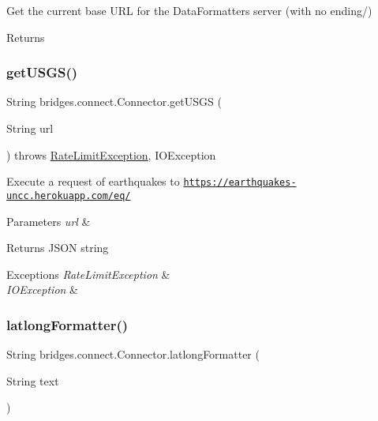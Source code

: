 Get the current base U\+RL for the Data\+Formatters server (with no ending/) \begin{DoxyReturn}{Returns}

\end{DoxyReturn}
\mbox{\label{classbridges_1_1connect_1_1_connector_a1781405c9b38c338bce042bf7ff23eaf}} 
\subsubsection{\texorpdfstring{get\+U\+S\+G\+S()}{getUSGS()}}
{\footnotesize\ttfamily String bridges.\+connect.\+Connector.\+get\+U\+S\+GS (\begin{DoxyParamCaption}\item[{String}]{url }\end{DoxyParamCaption}) throws \mbox{\hyperlink{classbridges_1_1validation_1_1_rate_limit_exception}{Rate\+Limit\+Exception}}, I\+O\+Exception}

Execute a request of earthquakes to \href{https://earthquakes-uncc.herokuapp.com/eq/}{\tt https\+://earthquakes-\/uncc.\+herokuapp.\+com/eq/} 
\begin{DoxyParams}{Parameters}
{\em url} & \\
\hline
\end{DoxyParams}
\begin{DoxyReturn}{Returns}
J\+S\+ON string 
\end{DoxyReturn}

\begin{DoxyExceptions}{Exceptions}
{\em Rate\+Limit\+Exception} & \\
\hline
{\em I\+O\+Exception} & \\
\hline
\end{DoxyExceptions}
\mbox{\label{classbridges_1_1connect_1_1_connector_a2318cd93d18ef58285598f6f9cdf727b}} 
\subsubsection{\texorpdfstring{latlong\+Formatter()}{latlongFormatter()}}
{\footnotesize\ttfamily String bridges.\+connect.\+Connector.\+latlong\+Formatter (\begin{DoxyParamCaption}\item[{String}]{text }\end{DoxyParamCaption})}

